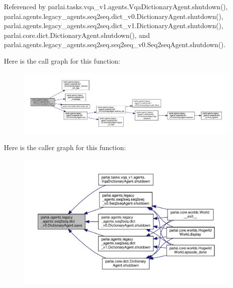 Referenced by parlai.\+tasks.\+vqa\+\_\+v1.\+agents.\+Vqa\+Dictionary\+Agent.\+shutdown(), parlai.\+agents.\+legacy\+\_\+agents.\+seq2seq.\+dict\+\_\+v0.\+Dictionary\+Agent.\+shutdown(), parlai.\+agents.\+legacy\+\_\+agents.\+seq2seq.\+dict\+\_\+v1.\+Dictionary\+Agent.\+shutdown(), parlai.\+core.\+dict.\+Dictionary\+Agent.\+shutdown(), and parlai.\+agents.\+legacy\+\_\+agents.\+seq2seq.\+seq2seq\+\_\+v0.\+Seq2seq\+Agent.\+shutdown().

Here is the call graph for this function\+:
\nopagebreak
\begin{figure}[H]
\begin{center}
\leavevmode
\includegraphics[width=350pt]{classparlai_1_1agents_1_1legacy__agents_1_1seq2seq_1_1dict__v0_1_1DictionaryAgent_ab2838da6f97c13b8eae241ac6db59417_cgraph}
\end{center}
\end{figure}
Here is the caller graph for this function\+:
\nopagebreak
\begin{figure}[H]
\begin{center}
\leavevmode
\includegraphics[width=350pt]{classparlai_1_1agents_1_1legacy__agents_1_1seq2seq_1_1dict__v0_1_1DictionaryAgent_ab2838da6f97c13b8eae241ac6db59417_icgraph}
\end{center}
\end{figure}
\mbox{\label{classparlai_1_1agents_1_1legacy__agents_1_1seq2seq_1_1dict__v0_1_1DictionaryAgent_ad1129f2e3f26f6d01fb1f2edfa61342c}} 
